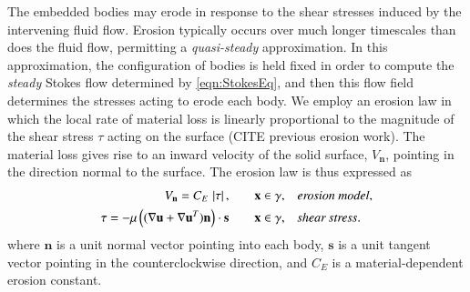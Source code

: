 \documentclass[3p]{elsarticle}
\newcommand{\nn}{{\mathbf{n}}}
\renewcommand{\ss}{{\mathbf{s}}}
\newcommand{\uu}{{\mathbf{u}}}
\newcommand{\UU}{{\mathbf{U}}}
\newcommand{\xx}{{\mathbf{x}}}
\newcommand{\abs}[1]{\left| #1 \right|}
\newcommand{\Vn}{V_\nn}
\newcommand{\CE}{C_E}
\begin{document}
The embedded bodies may erode in response to the shear stresses induced by the intervening fluid flow. Erosion typically occurs over much longer timescales than does the fluid flow, permitting a {\em quasi-steady} approximation. In this approximation, the configuration of bodies is held fixed in order to compute the {\em steady} Stokes flow determined by \eqref{eqn:StokesEq}, and then this flow field determines the stresses acting to erode each body. We employ an erosion law in which the local rate of material loss is linearly proportional to the magnitude of the shear stress $\tau$ acting on the surface (CITE previous erosion work). The material loss gives rise to an inward velocity of the solid surface, $\Vn$, pointing in the direction normal to the surface. The erosion law is thus expressed as
\begin{align}
\Vn = \CE \, \abs{\tau}, 
	&\hspace{20pt} \xx \in \gamma, &&\mbox{\em erosion model}, \\
\tau = -\mu \left( ( \nabla \uu + \nabla \uu^T) \nn \right) \cdot \ss
	&\hspace{20pt} \xx \in \gamma, &&\mbox{\em shear stress}.
  \label{eqn:shearStress}
\end{align}
where $\nn$ is a unit normal vector pointing into each body, $\ss$ is
a unit tangent vector pointing in the counterclockwise direction, and $\CE$ is a material-dependent erosion constant.




\end{document}
